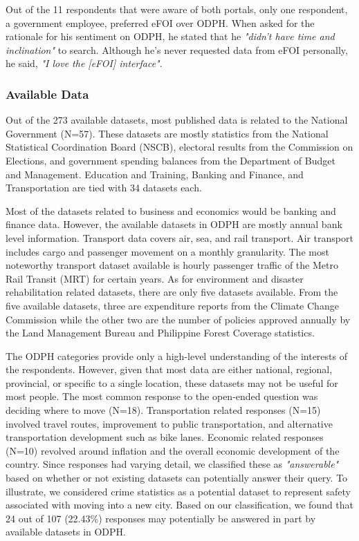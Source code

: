 \documentclass{sigchi}
\begin{document}
Out of the 11 respondents that were aware of both portals, only one respondent, a government employee, preferred eFOI over ODPH. When asked for the rationale for his sentiment on ODPH, he stated that he \textit{"didn't have time and inclination"} to search. Although he's never requested data from eFOI personally, he said, \textit{"I love the [eFOI] interface"}. 

\subsubsection{Available Data}
Out of the 273 available datasets, most published data is related to the National Government (N=57). These datasets are mostly statistics from the National Statistical Coordination Board (NSCB), electoral results from the Commission on Elections, and government spending balances from the Department of Budget and Management. Education and Training, Banking and Finance, and Transportation are tied with 34 datasets each. 

Most of the datasets related to business and economics would be banking and finance data. However, the available datasets in ODPH are mostly annual bank level information. Transport data covers air, sea, and rail transport. Air transport includes cargo and passenger movement on a monthly granularity. The most noteworthy transport dataset available is hourly passenger traffic of the Metro Rail Transit (MRT) for certain years. As for environment and disaster rehabilitation related datasets, there are only five datasets available. From the five available datasets, three are expenditure reports from the Climate Change Commission while the other two are the number of policies approved annually by the Land Management Bureau and Philippine Forest Coverage statistics. 


The ODPH categories provide only a high-level understanding of the interests of the respondents. However, given that most data are either national, regional, provincial, or specific to a single location, these datasets may not be useful for most people. The most common response to the open-ended question was deciding where to move (N=18). Transportation related responses (N=15) involved travel routes, improvement to public transportation, and alternative transportation development such as bike lanes. Economic related responses (N=10) revolved around inflation and the overall economic development of the country. Since responses had varying detail, we classified these as \textit{"answerable"} based on whether or not existing datasets can potentially answer their query. To illustrate, we considered crime statistics as a potential dataset to represent safety associated with moving into a new city. Based on our classification, we found that 24 out of 107 (22.43\%) responses may potentially be answered in part by available datasets in ODPH. 
\end{document}
